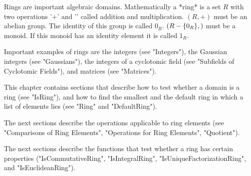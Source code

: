 
Rings are important algebraic  domains.  Mathematically a *ring* is a set
$R$ with two operations  '+' and '\*' called addition and multiplication.
$(R,+)$ must  be an abelian group.  The  identity of this group is called
$0_R$.   $(R-\{0_R\},\*)$  must be  a  monoid.   If  this  monoid has  an
identity element it is called $1_R$.

Important examples  of  rings   are the  integers (see "Integers"),   the
Gaussian  integers (see "Gaussians"), the integers of  a cyclotomic field
(see "Subfields of Cyclotomic Fields"), and matrices (see "Matrices").

This chapter contains sections that describe how to test whether a domain
is  a  ring (see "IsRing"), and how to find the smallest and  the default
ring in which a list of elements lies (see "Ring" and "DefaultRing").

The next  sections describe the  operations  applicable  to ring elements
(see  "Comparisons of  Ring  Elements", "Operations for Ring   Elements",
"Quotient").

The  next sections describe  the functions that test whether a  ring  has
certain      properties      ("IsCommutativeRing",      "IsIntegralRing",
"IsUniqueFactorizationRing", and "IsEuclideanRing").

